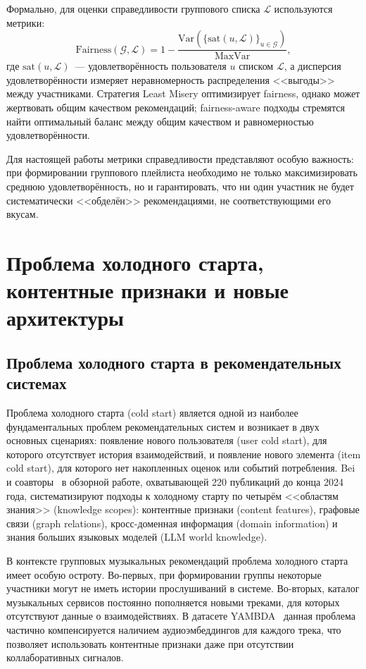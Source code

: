 Формально, для оценки справедливости группового списка $\mathcal{L}$ используются метрики:
\begin{equation}
    \mathrm{Fairness}(\mathcal{G}, \mathcal{L}) = 1 - \frac{\mathrm{Var}\left(\{\mathrm{sat}(u, \mathcal{L})\}_{u \in \mathcal{G}}\right)}{\mathrm{MaxVar}},
\end{equation}
где $\mathrm{sat}(u, \mathcal{L})$~--- удовлетворённость пользователя $u$ списком $\mathcal{L}$, а дисперсия удовлетворённости измеряет неравномерность распределения <<выгоды>> между участниками. Стратегия Least Misery оптимизирует fairness, однако может жертвовать общим качеством рекомендаций; fairness-aware подходы стремятся найти оптимальный баланс между общим качеством и равномерностью удовлетворённости.

Для настоящей работы метрики справедливости представляют особую важность: при формировании группового плейлиста необходимо не только максимизировать среднюю удовлетворённость, но и гарантировать, что ни один участник не будет систематически <<обделён>> рекомендациями, не соответствующими его вкусам.

\section{Проблема холодного старта, контентные признаки и новые архитектуры}

\subsection{Проблема холодного старта в рекомендательных системах}

Проблема холодного старта (cold start) является одной из наиболее фундаментальных проблем рекомендательных систем и возникает в двух основных сценариях: появление нового пользователя (user cold start), для которого отсутствует история взаимодействий, и появление нового элемента (item cold start), для которого нет накопленных оценок или событий потребления. Bei и соавторы~\cite{bei2025coldstart_survey} в обзорной работе, охватывающей 220 публикаций до конца 2024 года, систематизируют подходы к холодному старту по четырём <<областям знания>> (knowledge scopes): контентные признаки (content features), графовые связи (graph relations), кросс-доменная информация (domain information) и знания больших языковых моделей (LLM world knowledge).

В контексте групповых музыкальных рекомендаций проблема холодного старта имеет особую остроту. Во-первых, при формировании группы некоторые участники могут не иметь истории прослушиваний в системе. Во-вторых, каталог музыкальных сервисов постоянно пополняется новыми треками, для которых отсутствуют данные о взаимодействиях. В датасете YAMBDA~\cite{yambda2025} данная проблема частично компенсируется наличием аудиоэмбеддингов для каждого трека, что позволяет использовать контентные признаки даже при отсутствии коллаборативных сигналов.

